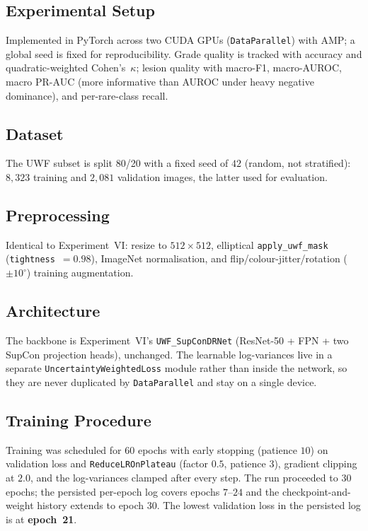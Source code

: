 \documentclass[journal,twoside,web]{ieeecolor}
\begin{document}
\subsection{Experimental Setup}
Implemented in PyTorch across two CUDA GPUs (\texttt{DataParallel}) with AMP; a
global seed is fixed for reproducibility. Grade quality is tracked with accuracy and
quadratic-weighted Cohen's~$\kappa$; lesion quality with macro-F1, macro-AUROC,
macro PR-AUC (more informative than AUROC under heavy negative dominance), and
per-rare-class recall.

\subsection{Dataset}
The UWF subset is split 80/20 with a fixed seed of $42$ (random, not stratified):
$8{,}323$ training and $2{,}081$ validation images, the latter used for evaluation.

\subsection{Preprocessing}
Identical to Experiment~VI: resize to $512\times512$, elliptical
\texttt{apply\_uwf\_mask} (\texttt{tightness}~$=0.98$), ImageNet normalisation, and
flip/colour-jitter/rotation ($\pm10^{\circ}$) training augmentation.

\subsection{Architecture}
The backbone is Experiment~VI's \texttt{UWF\_SupConDRNet} (ResNet-50 + FPN + two
SupCon projection heads), unchanged. The learnable log-variances live in a separate
\texttt{UncertaintyWeightedLoss} module rather than inside the network, so they are
never duplicated by \texttt{DataParallel} and stay on a single device.

\subsection{Training Procedure}
Training was scheduled for $60$ epochs with early stopping (patience $10$) on
validation loss and \texttt{ReduceLROnPlateau} (factor $0.5$, patience $3$),
gradient clipping at $2.0$, and the log-variances clamped after every step. The run
proceeded to $30$ epochs; the persisted per-epoch log covers epochs $7$--$24$ and
the checkpoint-and-weight history extends to epoch $30$. The lowest validation loss
in the persisted log is at \textbf{epoch~21}.
\end{document}
